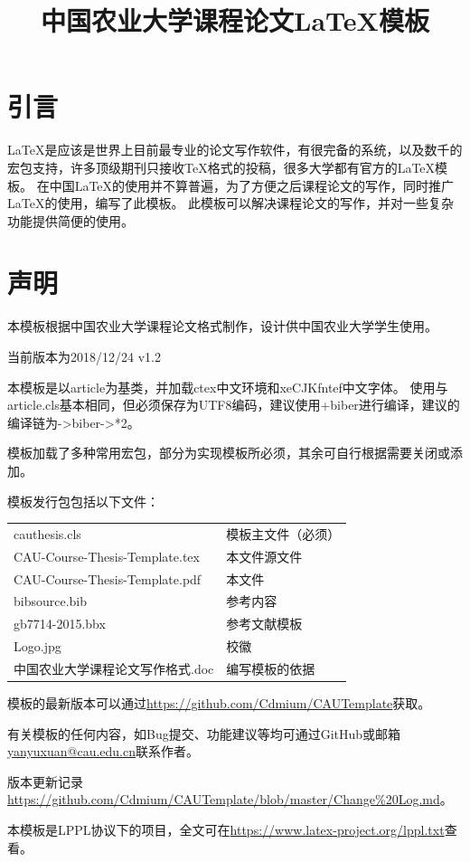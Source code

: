 \documentclass[twoside,maketable]{cauthesis}
\title{中国农业大学课程论文\LaTeX{}模板}%
\date{}%
\author{}%
\begin{document}
    \section{引言}
    \LaTeX{}是应该是世界上目前最专业的论文写作软件，有很完备的系统，以及数千的宏包支持，许多顶级期刊只接收\TeX{}格式的投稿，很多大学都有官方的\LaTeX{}模板。
    在中国\LaTeX{}的使用并不算普遍，为了方便之后课程论文的写作，同时推广\LaTeX{}的使用，编写了此模板。
    此模板可以解决课程论文的写作，并对一些复杂功能提供简便的使用。
    \section{声明}
    本模板根据中国农业大学课程论文格式制作，设计供中国农业大学学生使用。

    当前版本为2018/12/24 v1.2

    本模板是以article为基类，并加载ctex中文环境和xeCJKfntef中文字体。
    使用与article.cls基本相同，但必须保存为UTF8编码，建议使用\XeLaTeX{}+biber进行编译，建议的编译链为\XeLaTeX{}->biber->\XeLaTeX{}*2。

    模板加载了多种常用宏包，部分为实现模板所必须，其余可自行根据需要关闭或添加。

    模板发行包包括以下文件：

    \begin{table}[H]
        \begin{tabular}{ll}
            cauthesis.cls&模板主文件（必须）\\
            CAU-Course-Thesis-Template.tex&本文件源文件\\
            CAU-Course-Thesis-Template.pdf&本文件\\
            bibsource.bib&参考内容\\
            gb7714-2015.bbx&参考文献模板\\
            Logo.jpg&校徽\\
            中国农业大学课程论文写作格式.doc&编写模板的依据
        \end{tabular}
    \end{table}
    
    模板的最新版本可以通过\url{https://github.com/Cdmium/CAUTemplate}获取。

    有关模板的任何内容，如Bug提交、功能建议等均可通过GitHub或邮箱\url{yanyuxuan@cau.edu.cn}联系作者。

    版本更新记录\url{https://github.com/Cdmium/CAUTemplate/blob/master/Change%20Log.md}。

    本模板是LPPL协议下的项目，全文可在\url{https://www.latex-project.org/lppl.txt}查看。
\end{document}
